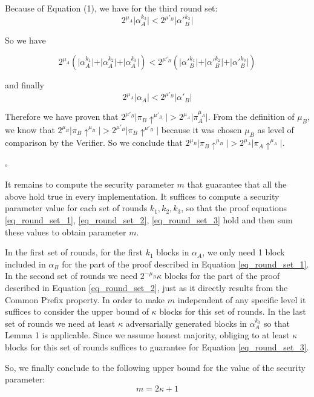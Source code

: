 Because of Equation (1), we have for the third round set:
\begin{equation} \label{eq_round_set_3}
2^{\mu_A} \vert \alpha_A^{k_3} \vert < 2^{\mu'_B} \vert \alpha'{_B^{k_3}} \vert
\end{equation}

So we have

\begin{equation*}
2^{\mu_A} ( \vert \alpha_A^{k_1} \vert + \vert \alpha_A^{k_2} \vert + \vert \alpha_A^{k_3} \vert ) < 2^{\mu'_B} ( \vert \alpha'{_B^{k_1}} \vert + \vert \alpha'{_B^{k_2}} \vert + \vert \alpha'{_B^{k_3}} \vert)
\end{equation*}

and finally 
\begin{equation}
2^{\mu_A} \vert \alpha_A \vert < 2^{\mu'_B} \vert \alpha'{_B} \vert
\end{equation}


Therefore we have proven that $2^{\mu'_B} \vert \pi_B \uparrow^{\mu'_B} \vert > 2^{\mu_A} \vert \pi_A^{\mu_A} \vert$. From the definition of $\mu_B$, we know that $2^{\mu_B} \vert \pi_B \uparrow^{\mu_B} \vert > 2^{\mu'_B} \vert \pi_B \uparrow^{\mu'_B} \vert$ because it was chosen $\mu_B$ as level of comparison by the Verifier. So we conclude that $2^{\mu_B} \vert \pi_B \uparrow^{\mu_B} \vert > 2^{\mu_A} \vert \pi_A \uparrow^{\mu_A} \vert$.

\begin{flushright}
$\square$
\end{flushright}

It remains to compute the security parameter $m$ that guarantee that all the above hold true in every implementation. It suffices to compute a security parameter value for each set of rounds $k_1, k_2, k_3$, so that the proof equations \ref{eq_round_set_1}, \ref{eq_round_set_2}, \ref{eq_round_set_3} hold and then sum these values to obtain parameter $m$.

In the first set of rounds, for the first $k_1$ blocks in $\alpha_A$, we only need 1 block included in $\alpha_B$ for the part of the proof described in Equation \ref{eq_round_set_1}. In the second set of rounds we need $2^{-\mu_B}\kappa$ blocks for the part of the proof described in Equation \ref{eq_round_set_2}, just as it directly results from the Common Prefix property. In order to make $m$ independent of any specific level it suffices to consider the upper bound of $\kappa$ blocks for this set of rounds. In the last set of rounds we need at least $\kappa$ adversarially generated blocks in $\alpha_A^{k_3}$ so that Lemma 1 is applicable. Since we assume honest majority, obliging to at least $\kappa$ blocks for this set of rounds suffices to guarantee for Equation \ref{eq_round_set_3}.

So, we finally conclude to the following upper bound for the value of the
 security parameter:
\begin{equation}
m = 2\kappa + 1 
\end{equation}
 

